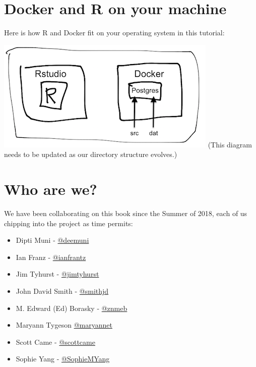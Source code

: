 \documentclass[]{book}
\providecommand{\tightlist}{%
  \setlength{\itemsep}{0pt}\setlength{\parskip}{0pt}}
\theoremstyle{definition}
\theoremstyle{definition}
\theoremstyle{definition}
\theoremstyle{remark}
\begin{document}
\hypertarget{docker-and-r-on-your-machine}{%
\section{Docker and R on your
machine}\label{docker-and-r-on-your-machine}}

Here is how R and Docker fit on your operating system in this tutorial:

\includegraphics{./screenshots/r-and-docker.png} (This diagram needs to
be updated as our directory structure evolves.)

\hypertarget{who-are-we}{%
\section{Who are we?}\label{who-are-we}}

We have been collaborating on this book since the Summer of 2018, each
of us chipping into the project as time permits:

\begin{itemize}
\tightlist
\item
  Dipti Muni - \href{https://github.com/deemuni}{@deemuni}
\item
  Ian Franz - \href{https://github.com/ianfrantz}{@ianfrantz}
\item
  Jim Tyhurst - \href{https://github.com/jimtyhurst}{@jimtyhurst}
\item
  John David Smith - \href{https://github.com/smithjd}{@smithjd}
\item
  M. Edward (Ed) Borasky - \href{https://github.com/znmeb}{@znmeb}
\item
  Maryann Tygeson \href{https://github.com/maryannet}{@maryannet}
\item
  Scott Came - \href{https://github.com/scottcame}{@scottcame}
\item
  Sophie Yang - \href{https://github.com/SophieMYang}{@SophieMYang}
\end{itemize}
\end{document}
